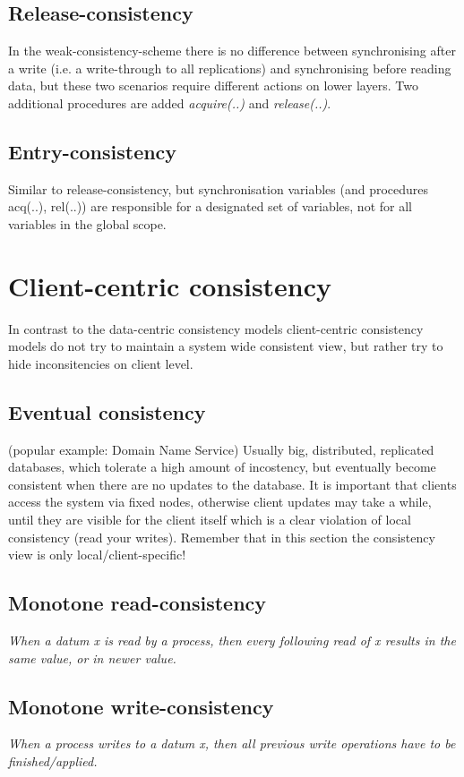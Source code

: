 \subsection{Release-consistency}
In the weak-consistency-scheme there is no difference between synchronising after a write (i.e. a write-through to all replications) and synchronising before reading data, but these two scenarios require different actions on lower layers.
Two additional procedures are added \emph{acquire(..)} and \emph{release(..)}.

\subsection{Entry-consistency}
Similar to release-consistency, but synchronisation variables (and procedures acq(..), rel(..)) are responsible for a designated set of variables, not for all variables in the global scope.

\section{Client-centric consistency}
In contrast to the data-centric consistency models client-centric consistency models do not try to maintain a system wide consistent view, but rather try to hide inconsitencies on client level.

\subsection{Eventual consistency}
(popular example: Domain Name Service)
Usually big, distributed, replicated databases, which tolerate a high amount of incostency, but eventually become consistent when there are no updates to the database.
It is important that clients access the system via fixed nodes, otherwise client updates may take a while, until they are visible for the client itself which is a clear violation of local consistency (read your writes).
Remember that in this section the consistency view is only local/client-specific!

\subsection{Monotone read-consistency}
\emph{When a datum x is read by a process, then every following read of x results in the same value, or in newer value.}

\subsection{Monotone write-consistency}
\emph{When a process writes to a datum x, then all previous write operations have to be finished/applied.}

